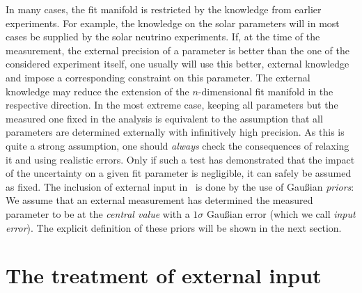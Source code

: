 In many cases, the fit manifold is restricted by the knowledge 
from earlier experiments. For example, the knowledge on the solar 
parameters will in most cases be supplied by the solar neutrino experiments. 
If, at the time of the measurement, the external precision of a parameter is
better than the one of the considered experiment itself, one usually will use
this better, external knowledge and impose a corresponding constraint
 on this parameter. The external knowledge may reduce the extension of the 
$n$-dimensional fit manifold in the respective direction. In the most 
extreme case, keeping all parameters but the measured one fixed 
in the analysis is equivalent to the assumption that all parameters 
are determined externally with infinitively high precision. As this 
is quite a strong assumption, one should \emph{always} check the 
consequences of relaxing it and using realistic errors. Only if such
a test has demonstrated that the impact of the uncertainty on a 
given fit parameter is negligible, it can safely be assumed as fixed. 
 The inclusion of external input in \GLOBES\ is done by the use of 
Gau\ss ian {\em priors}: We assume that an external measurement has 
determined the measured parameter to be at the \emph{central value}
with a $1 \sigma$ Gau\ss ian error (which we call {\em input error}).
The explicit definition of these priors will be shown in the next section. 

\section{The treatment of external input}
\label{sec:externalinput}

